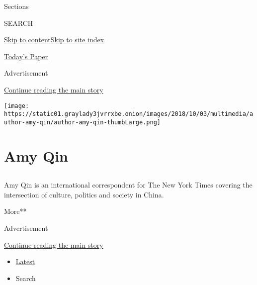 Sections

SEARCH

\protect\hyperlink{site-content}{Skip to
content}\protect\hyperlink{site-index}{Skip to site index}

\href{https://myaccount.nytimes3xbfgragh.onion/auth/login?response_type=cookie\&client_id=vi}{}

\href{https://www.nytimes3xbfgragh.onion/section/todayspaper}{Today's
Paper}

Advertisement

\protect\hyperlink{after-top}{Continue reading the main story}

\texttt{[image: https://static01.graylady3jvrrxbe.onion/images/2018/10/03/multimedia/author-amy-qin/author-amy-qin-thumbLarge.png]}

\hypertarget{amy-qin}{%
\section{Amy Qin}\label{amy-qin}}

\hypertarget{section}{%
\subsection{}\label{section}}

Amy Qin is an international correspondent for The New York Times
covering the intersection of culture, politics and society in China.

More**

Advertisement

\protect\hyperlink{after-mid1}{Continue reading the main story}

\begin{itemize}
\tightlist
\item
  \protect\hyperlink{stream-panel}{Latest}
\item
  Search
\end{itemize}

